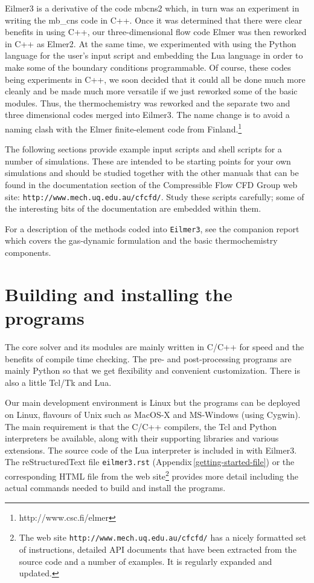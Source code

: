 \documentclass[12pt,a4paper,twoside]{article}
\begin{document}
\medskip
Eilmer3 is a derivative of the code mbcns2 which, in turn was an experiment in writing
the mb\_cns code in C++.
Once it was determined that there were clear benefits in using C++,
our three-dimensional flow code Elmer was then reworked in C++ as Elmer2.
At the same time, we experimented with using the Python language for the user's input script and 
embedding the Lua language in order to make some of the boundary conditions programmable.
Of course, these codes being experiments in C++, we soon decided that it could all be done
much more cleanly and be made much more versatile if we just reworked some of the basic modules.
Thus, the thermochemistry was reworked and the separate two and three dimensional codes merged
into Eilmer3.
The name change is to avoid a naming clash with the Elmer finite-element code 
from Finland.\footnote{http://www.csc.fi/elmer} 

\medskip 
The following sections provide example input scripts and shell scripts for a number of simulations.
These are intended to be starting points for your own simulations and should be studied together with 
the other manuals that can be found in the documentation section of the 
Compressible Flow CFD Group web site:  
\texttt{http://www.mech.uq.edu.au/cfcfd/}.
Study these scripts carefully; some of the interesting bits of the documentation are
embedded within them.

\medskip
For a description of the methods coded into \texttt{Eilmer3}, see the companion report \cite{jacobs_etal_2010b}
which covers the gas-dynamic formulation and the basic thermochemistry components.

\clearpage
\section{Building and installing the programs}
%
The core solver and its modules are mainly written in C/C++ for speed and the benefits of compile time checking. 
The pre- and post-processing programs are mainly Python so that we get flexibility and convenient customization.
There is also a little Tcl/Tk and Lua.

\medskip
Our main development environment is Linux but the programs can be deployed on
Linux, flavours of Unix such as MacOS-X and MS-Windows (using Cygwin).
The main requirement is that the C/C++ compilers, the Tcl and Python
interpreters be available, along with their supporting libraries and 
various extensions. 
The source code of the Lua interpreter is included in with Eilmer3.
The reStructuredText file \texttt{eilmer3.rst} (Appendix\,\ref{getting-started-file}) 
or the corresponding HTML file from the web site\footnote{The web site 
\texttt{http://www.mech.uq.edu.au/cfcfd/} has a nicely formatted set of instructions,
detailed API documents that have been extracted from the source code and 
a number of examples.  It is regularly expanded and updated.}
provides more detail including 
the actual commands needed to build and install the programs.
\end{document}
